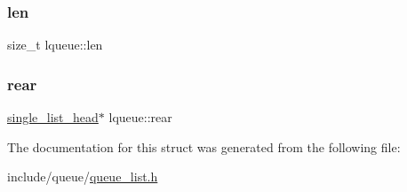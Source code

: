\subsubsection{\texorpdfstring{len}{len}}
{\footnotesize\ttfamily size\+\_\+t lqueue\+::len}

\mbox{\label{structlqueue_a07f47d270480bb3432b8802cbca43082}} 
\subsubsection{\texorpdfstring{rear}{rear}}
{\footnotesize\ttfamily \mbox{\hyperlink{structsingle__list__head}{single\+\_\+list\+\_\+head}}$\ast$ lqueue\+::rear}



The documentation for this struct was generated from the following file\+:\begin{DoxyCompactItemize}
\item 
include/queue/\mbox{\hyperlink{queue__list_8h}{queue\+\_\+list.\+h}}\end{DoxyCompactItemize}
